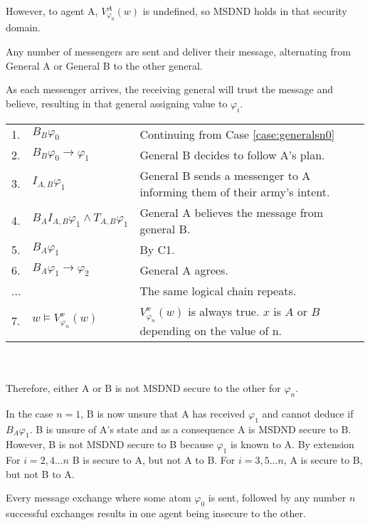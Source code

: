 However, to agent A, $V_{\varphi_{0}}^A(w)$ is undefined, so MSDND holds in that security domain. 

\begin{case}
Any number of messengers are sent and deliver their message, alternating from General A or General B to the other general. \label{case:generalsnn}
\end{case}

As each messenger arrives, the receiving general will trust the message and believe, resulting in that general assigning value to $\varphi_i$.

\begin{table}[h!]
\centering
\small
\begin{tabularx}{\linewidth}{l l X}
1. & $B_{B} \varphi_0$ & Continuing from Case \ref{case:generalsn0} \\
2. & $B_{B} \varphi_0 \rightarrow \varphi_1$ & General B decides to follow A's plan. \\
3. & $I_{A,B} \varphi_1$ & General B sends a messenger to A informing them of their army's intent. \\
4. & $B_{A}I_{A,B} \varphi_1 \wedge T_{A,B} \varphi_1$ & General A believes the message from general B. \\
5. & $B_{A}\varphi_1$ & By C1. \\
6. & $B_{A}\varphi_1 \rightarrow \varphi_2$ & General A agrees. \\
...& & The same logical chain repeats. \\
7. & $w \vDash V_{\varphi_n}^{x}(w)$ & $V_{\varphi_n}^{x}(w)$ is always true. $x$ is $A$ or $B$ depending on the value of n. %
\end{tabularx} \\~\\
Therefore, either A or B is not MSDND secure to the other for $\varphi_n$.
\label{tab:twoarmiesproof2}
\end{table}

In the case $n=1$, B is now unsure that A has received $\varphi_1$ and cannot deduce if $B_{A} \varphi_1$. B is unsure of A's state and as a consequence A is MSDND secure to B. However, B is not MSDND secure to B because $\varphi_1$ is known to A. By extension For $i=2,4...n$ B is secure to A, but not A to B. For $i=3,5...n$, A is secure to B, but not B to A.

\begin{cor}
Every message exchange where some atom $\varphi_0$ is sent, followed by any number $n$ successful exchanges results in one agent being insecure to the other.
\end{cor}

